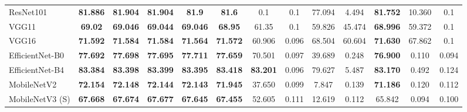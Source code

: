 \begin{table}[]
{\begin{tabular}{|l|cc|c|cccc|cc|ccc|}
ResNet101       & \textbf{81.886}                                                       & \textbf{81.904}                                                     & \textbf{81.904}  & \textbf{81.9}    & \textbf{81.6}    & 0.1             & 0.1             & 77.094           & 4.494            & \textbf{81.752}  & 10.360           & 0.1           \\
\rowcolor[HTML]{EFEFEF}
VGG11           & \textbf{69.02}                                                        & \textbf{69.046}                                                     & \textbf{69.044}  & \textbf{69.046}  & \textbf{68.95}   & 61.35           & 0.1             & 59.826           & 45.474           & \textbf{68.996}  & 59.372           & 0.1           \\
VGG16           & \textbf{71.592}                                                       & \textbf{71.584}                                                     & \textbf{71.584}  & \textbf{71.564}  & \textbf{71.572}  & 60.906          & 0.096           & 68.504           & 60.604           & \textbf{71.630}  & 67.862           & 0.1           \\
\rowcolor[HTML]{EFEFEF}
EfficientNet-B0 & \textbf{77.692}                                                       & \textbf{77.698}                                                     & \textbf{77.695}  & \textbf{77.711}  & \textbf{77.659}  & 70.501          & 0.097           & 39.689           & 0.248            & \textbf{76.900}  & 0.110            & 0.094         \\
EfficientNet-B4 & \textbf{83.384}                                                       & \textbf{83.398}                                                     & \textbf{83.399}  & \textbf{83.395}  & \textbf{83.418}  & \textbf{83.201} & 0.096           & 79.627           & 5.487            & \textbf{83.170}  & 0.492            & 0.124         \\
\rowcolor[HTML]{EFEFEF}
MobileNetV2     & \textbf{72.154}                                                       & \textbf{72.148}                                                     & \textbf{72.144}  & \textbf{72.143}  & \textbf{71.945}  & 37.650          & 0.099           & 7.847            & 0.139            & \textbf{71.186}  & 0.120            & 0.112         \\
MobileNetV3 (S) & \textbf{67.668}                                                       & \textbf{67.674}                                                     & \textbf{67.677}  & \textbf{67.645}  & \textbf{67.455}  & 52.605          & 0.111           & 12.619           & 0.112            & 65.842           & 0.094            & 0.100         \\ \hline
\end{tabular}%
}
\end{table}
